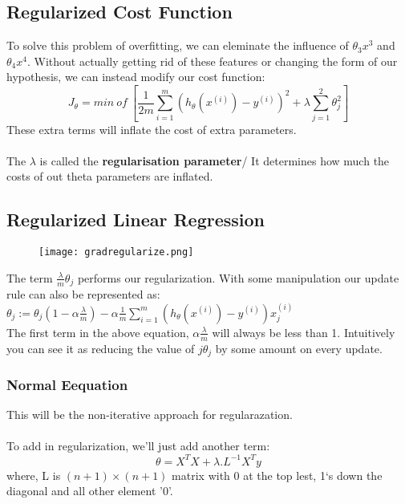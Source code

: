   \subsection{Regularized Cost Function}
    To solve this problem of overfitting, we can eleminate the influence of $\theta_3x^3$ and $\theta_4x^4$. Without actually getting rid of these features or changing the form of our hypothesis, we can instead modify our cost function:
    \begin{equation}
      J_\theta = min\ of\ \left[ \frac{1}{2m} \sum_{i=1}^{m}(h_\theta(x^{(i)}) - y^{(i)})^2 + \lambda\sum_{j=1}^2\theta_j^2 \right]
    \end{equation}
    These extra terms will inflate the cost of extra parameters. \\ \\
    The $\lambda$ is called the \textbf{regularisation parameter}/ It determines how much the costs of out theta parameters are inflated.

  \subsection{Regularized Linear Regression}
    \begin{figure}[h]
      \centering
      \texttt{[image: gradregularize.png]}
    \end{figure}


    The term $\frac{\lambda}{m}\theta_{j}$ performs our regularization. With some manipulation our update rule can also be represented as:\\

    $ \theta_j := \theta_j(1 - \alpha\frac{\lambda}{m}) - \alpha\frac{1}{m}\sum_{i=1}^m(h_\theta(x^{(i)}) - y^{(i)})x_j^{(i)} $\\

    The first term in the above equation, $\alpha\frac{\lambda}{m}$ will always be less than 1. Intuitively you can see it as reducing the value of $j\theta_j$ by some amount on every update.

    \subsubsection{Normal Eequation}
      This will be the non-iterative approach for regularazation.\\\\
      To add in regularization, we'll just add another term:
      \begin{equation}
        \theta = X^T X + \lambda . L^{-1} X^T y
      \end{equation}
      where, L is $(n+1)\times(n+1)$ matrix with 0 at the top lest, 1`s down the diagonal and all other element '0'.
